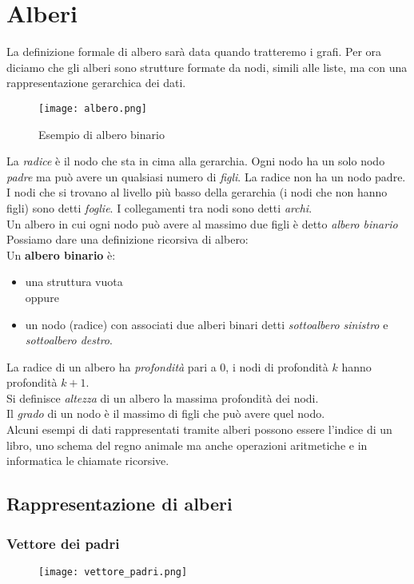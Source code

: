 \section{Alberi}
La definizione formale di albero sarà data quando tratteremo i grafi. Per ora 
diciamo che gli alberi sono strutture formate da nodi, simili alle liste, ma
con una rappresentazione gerarchica dei dati.
\begin{wrapfigure}{r}{7cm}
    \caption{Esempio di albero binario}
    \texttt{[image: albero.png]}
\end{wrapfigure}
La \emph{radice} è il nodo che sta in cima alla gerarchia. Ogni nodo ha un solo nodo 
{\emph{padre}} ma può avere un qualsiasi numero di \emph{figli}. La radice non ha un nodo padre.
I nodi che si trovano al livello più basso della gerarchia (i nodi che non hanno figli) sono detti
\emph{foglie}.
I collegamenti tra nodi sono detti \emph{archi}.\\
Un albero in cui ogni nodo può avere al massimo due figli è detto \emph{albero binario}
Possiamo dare una definizione ricorsiva di albero:\\
Un \textbf{albero binario} è:
\begin{itemize}
    \item una struttura vuota\\
    oppure 
    \item un nodo (radice) con associati due alberi binari detti \emph{sottoalbero sinistro} e \emph{sottoalbero destro}.
\end{itemize}
La radice di un albero ha \emph{profondità} pari a 0, i nodi di profondità $k$ 
hanno profondità $k + 1$.\\
Si definisce {\emph{altezza}} di un albero la massima profondità dei nodi.\\
Il \emph{grado} di un nodo è il massimo di figli che può avere quel nodo.\\
Alcuni esempi di dati rappresentati tramite alberi possono essere l'indice di un 
libro, uno schema del regno animale ma anche operazioni aritmetiche e in informatica
le chiamate ricorsive.
\subsection{Rappresentazione di alberi}
\subsubsection{Vettore dei padri}
\begin{figure}[h]
    \texttt{[image: vettore\_padri.png]}
\end{figure}
\clearpage


